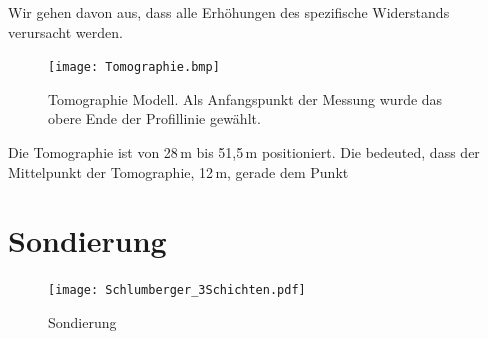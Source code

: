 Wir gehen davon aus, dass alle Erhöhungen des spezifische Widerstands verursacht werden. 


\begin{figure}[h]
\centering
\texttt{[image: Tomographie.bmp]}
\caption{Tomographie Modell. Als Anfangspunkt der Messung wurde das obere Ende der Profillinie gewählt.}
\label{abb:Tomographie}
\end{figure}

Die Tomographie ist von 28\,m  bis 51,5\,m positioniert. Die bedeuted, dass der Mittelpunkt der Tomographie, 12\,m, gerade dem Punkt  


\section{Sondierung}


\begin{figure}[h]
\centering
\texttt{[image: Schlumberger\_3Schichten.pdf]}
\caption{Sondierung}
\label{abb:Tomographie}
\end{figure}
